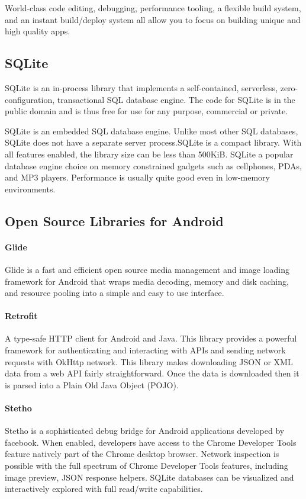 \documentclass[BTech]{srmuthesis}
\begin{document}
World-class code editing, debugging, performance tooling, a flexible build system, and an instant build/deploy system all allow you to focus on building unique and high quality apps.
\subsection{SQLite}
SQLite is an in-process library that implements a self-contained, serverless, zero-configuration, transactional SQL database engine. The code for SQLite is in the public domain and is thus free for use for any purpose, commercial or private.

SQLite is an embedded SQL database engine. Unlike most other SQL databases, SQLite does not have a separate server process.SQLite is a compact library. With all features enabled, the library size can be less than 500KiB. SQLite a popular database engine choice on memory constrained gadgets such as cellphones, PDAs, and MP3 players. Performance is usually quite good even in low-memory environments.

\subsection{Open Source Libraries for Android}
\paragraph{Glide}
Glide is a fast and efficient open source media management and image loading framework for Android that wraps media decoding, memory and disk caching, and resource pooling into a simple and easy to use interface.
\paragraph{Retrofit}
A type-safe HTTP client for Android and Java.
This library provides a powerful framework for authenticating and interacting with APIs and sending network requests with OkHttp network.
This library makes downloading JSON or XML data from a web API fairly straightforward. Once the data is downloaded then it is parsed into a Plain Old Java Object (POJO).
\paragraph{Stetho}
Stetho is a sophisticated debug bridge for Android applications developed by facebook. When enabled, developers have access to the Chrome Developer Tools feature natively part of the Chrome desktop browser.
Network inspection is possible with the full spectrum of Chrome Developer Tools features, including image preview, JSON response helpers.
SQLite databases can be visualized and interactively explored with full read/write capabilities.
\end{document}
